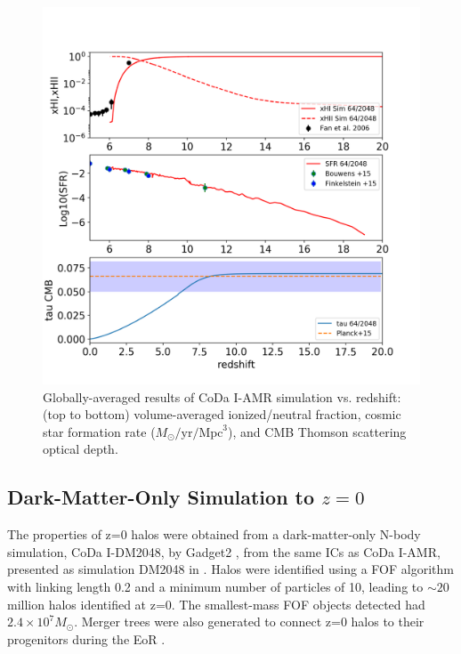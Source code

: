\documentclass[twocolumn]{aastex61}
\begin{document}
\begin{figure}[ht!]
\includegraphics[height=1.10\columnwidth, width=1.00\columnwidth]{img/x_sfr_tau.png}
\caption{Globally-averaged results of CoDa I-AMR simulation vs. redshift: (top to bottom) volume-averaged ionized/neutral fraction, cosmic star formation rate ($M_\odot/\mathrm{yr}/\mathrm{Mpc}^3$),
and CMB Thomson scattering optical depth.}
\label{fig:globpro}
\end{figure}


\subsection{Dark-Matter-Only Simulation to $z = 0$}

The properties of z=0 halos were obtained from a dark-matter-only N-body simulation, CoDa I-DM2048, by Gadget2 \citep{SPR5}, from the same ICs as CoDa I-AMR, presented as simulation DM2048 in \citet{OCV16}. %
Halos were identified using a FOF algorithm with linking length 0.2 and a minimum number of particles of 10, leading to $\sim 20$ million halos identified at z=0. The smallest-mass FOF objects detected had $2.4\times 10^7 M_\odot$. Merger trees were also generated to connect z=0 halos to their progenitors during the EoR \citep{RIE13}. 
\end{document}

